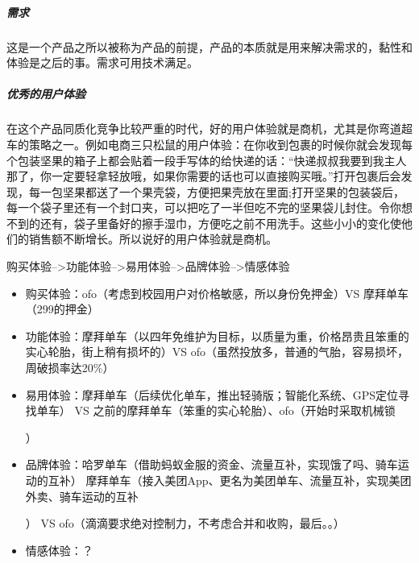 \documentclass[letterpaper,10pt,english]{sphinxmanual}
\begin{document}
\subparagraph{需求}
\label{\detokenize{chapter_introduction/Product:id8}}
这是一个产品之所以被称为产品的前提，产品的本质就是用来解决需求的，黏性和体验是之后的事。需求可用技术满足。


\subparagraph{优秀的用户体验}
\label{\detokenize{chapter_introduction/Product:id9}}
在这个产品同质化竞争比较严重的时代，好的用户体验就是商机，尤其是你弯道超车的策略之一。例如电商三只松鼠的用户体验：在你收到包裹的时候你就会发现每个包装坚果的箱子上都会贴着一段手写体的给快递的话：“快递叔叔我要到我主人那了，你一定要轻拿轻放哦，如果你需要的话也可以直接购买哦。”打开包裹后会发现，每一包坚果都送了一个果壳袋，方便把果壳放在里面;打开坚果的包装袋后，每一个袋子里还有一个封口夹，可以把吃了一半但吃不完的坚果袋儿封住。令你想不到的还有，袋子里备好的擦手湿巾，方便吃之前不用洗手。这些小小的变化使他们的销售额不断增长。所以说好的用户体验就是商机。

%
\begin{footnote}[40]\sphinxAtStartFootnote
{}
%
\end{footnote}

购买体验–>功能体验–>易用体验–>品牌体验–>情感体验
\begin{itemize}
\item {} 
购买体验：ofo（考虑到校园用户对价格敏感，所以身份免押金）VS
摩拜单车（299的押金）

\item {} 
功能体验：摩拜单车（以四年免维护为目标，以质量为重，价格昂贵且笨重的实心轮胎，街上稍有损坏的）VS
ofo（虽然投放多，普通的气胎，容易损坏，周破损率达20\%）

\item {} 
易用体验：摩拜单车（后续优化单车，推出轻骑版；智能化系统、GPS定位寻找单车）
VS
之前的摩拜单车（笨重的实心轮胎）、ofo（开始时采取机械锁%
\begin{footnote}[41]\sphinxAtStartFootnote
{}
%
\end{footnote}）

\item {} 
品牌体验：哈罗单车（借助蚂蚁金服的资金、流量互补，实现饿了吗、骑车运动的互补）
摩拜单车（接入美团App、更名为美团单车、流量互补，实现美团外卖、骑车运动的互补%
\begin{footnote}[42]\sphinxAtStartFootnote
{}
%
\end{footnote}）
VS ofo（滴滴要求绝对控制力，不考虑合并和收购，最后。。）

\item {} 
情感体验：？

\end{itemize}
\end{document}
